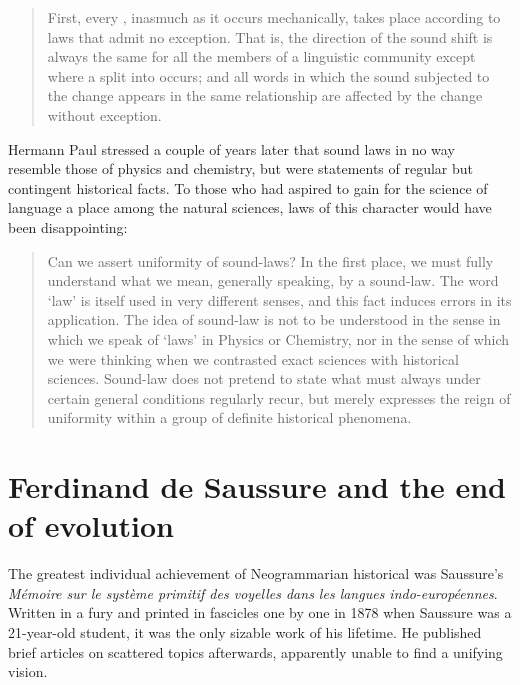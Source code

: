 \documentclass[output=paper,
modfonts
]{LSP/langsci}
\begin{document}
\begin{quote}
First, every , inasmuch as it occurs mechanically, takes place according to laws that admit no exception. That is, the direction of the sound shift is always the same for all the members of a linguistic community except where a split into  occurs; and all words in which the sound subjected to the change appears in the same relationship are affected by the change without exception. \citep[204]{osthoffandbrugmann1878}
\end{quote}

Hermann Paul stressed a couple of years later that sound laws in no way resemble those of physics and chemistry, but were statements of regular but contingent historical facts. To those who had aspired to gain for the science of language a place among the natural sciences, laws of this character would have been disappointing:

\begin{quote}
Can we assert uniformity of sound-laws? In the first place, we must fully understand what we mean, generally speaking, by a sound-law. The word ‘law' is itself used in very different senses, and this fact induces errors in its application. The idea of sound-law is not to be understood in the sense in which we speak of ‘laws' in Physics or Chemistry, nor in the sense of which we were thinking when we contrasted exact sciences with historical sciences. Sound-law does not pretend to state what must always under certain general conditions regularly recur, but merely expresses the reign of uniformity within a group of definite historical phenomena. \citep[57]{Paul1880}
\end{quote}

\section{Ferdinand de Saussure and the end of evolution}

The greatest individual achievement of Neogrammarian historical  was Saussure's \emph{M\'emoire sur le syst\`eme primitif des voyelles dans les langues indo-europ\'eennes}.  Written in a fury and printed in fascicles one by one in 1878 when Saussure was a 21-year-old student, it was the only sizable work of his lifetime. He published brief articles on scattered topics afterwards, apparently unable to find a unifying vision.
\end{document}
